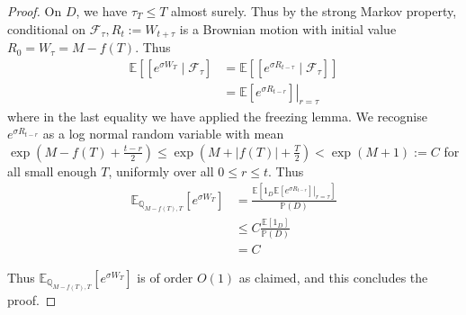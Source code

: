\documentclass[10pt,a4paper]{amsart}
\begin{document}
\begin{proof}
On $D$, we have $\tau_{T} \leq T$ almost surely. Thus by the strong Markov property, conditional on $\mathcal{F}_{\tau}, R_{t}:=W_{t+\tau}$ is a Brownian motion with initial value $R_{0}=W_{\tau}=M-f(T)$. Thus
$$
\begin{aligned}
\mathbb{E}\left[\left[e^{\sigma W_{T}} \mid \mathcal{F}_{\tau}\right]\right. & =\mathbb{E}\left[\left[e^{\sigma R_{t-\tau}} \mid \mathcal{F}_{\tau}\right]\right] \\
& =\left.\mathbb{E}\left[e^{\sigma R_{t-r}}\right]\right|_{r=\tau}
\end{aligned}
$$
where in the last equality we have applied the freezing lemma. We recognise $e^{\sigma R_{t-r}}$ as a log normal random variable with mean $\exp \left(M-f(T)+\frac{t-r}{2}\right) \leq \exp \left(M+|f(T)|+\frac{T}{2}\right)<\exp (M+1):=C$ for all small enough $T$, uniformly over all $0 \leq r \leq t$. Thus
$$
\begin{aligned}
\mathbb{E}_{\mathbb{Q}_{M-f(T), T}}\left[e^{\sigma W_{T}}\right] & =\frac{\mathbb{E}\left[\left.1_{D} \mathbb{E}\left[e^{\sigma R_{t-r}}\right]\right|_{r=\tau}\right]}{\mathbb{P}(D)} \\
& \leq C \frac{\mathbb{E}\left[1_{D}\right]}{\mathbb{P}(D)} \\
& =C
\end{aligned}
$$

Thus $\mathbb{E}_{\mathbb{Q}_{M-f(T), T}}\left[e^{\sigma W_{T}}\right]$ is of order $O(1)$ as claimed, and this concludes the proof.
\end{proof}
\end{document}
